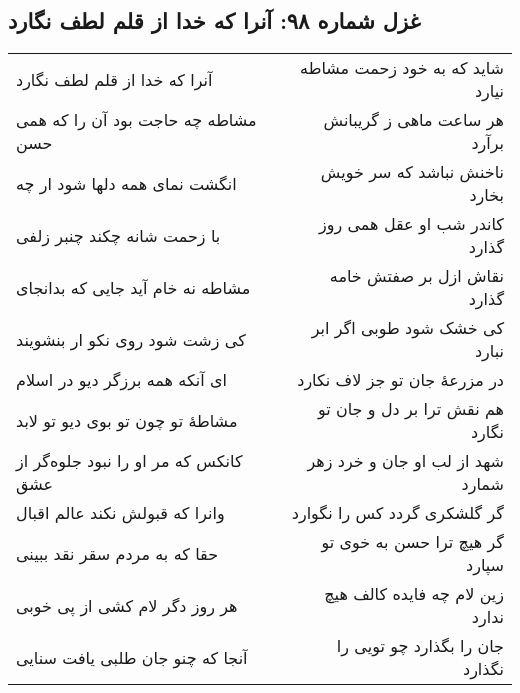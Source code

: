 \begin{center}
\section*{غزل شماره ۹۸: آنرا که خدا از قلم لطف نگارد}
\label{sec:098}
\begin{longtable}{l p{0.5cm} r}
آنرا که خدا از قلم لطف نگارد
&&
شاید که به خود زحمت مشاطه نیارد
\\
مشاطه چه حاجت بود آن را که همی حسن
&&
هر ساعت ماهی ز گریبانش برآرد
\\
انگشت نمای همه دلها شود ار چه
&&
ناخنش نباشد که سر خویش بخارد
\\
با زحمت شانه چکند چنبر زلفی
&&
کاندر شب او عقل همی روز گذارد
\\
مشاطه نه خام آید جایی که بدانجای
&&
نقاش ازل بر صفتش خامه گذارد
\\
کی زشت شود روی نکو ار بنشویند
&&
کی خشک شود طوبی اگر ابر نبارد
\\
ای آنکه همه برزگر دیو در اسلام
&&
در مزرعهٔ جان تو جز لاف نکارد
\\
مشاطهٔ تو چون تو بوی دیو تو لابد
&&
هم نقش ترا بر دل و جان تو نگارد
\\
کانکس که مر او را نبود جلوه‌گر از عشق
&&
شهد از لب او جان و خرد زهر شمارد
\\
وانرا که قبولش نکند عالم اقبال
&&
گر گلشکری گردد کس را نگوارد
\\
حقا که به مردم سقر نقد ببینی
&&
گر هیچ ترا حسن به خوی تو سپارد
\\
هر روز دگر لام کشی از پی خوبی
&&
زین لام چه فایده کالف هیچ ندارد
\\
آنجا که چنو جان طلبی یافت سنایی
&&
جان را بگذارد چو تویی را نگذارد
\\
\end{longtable}
\end{center}
